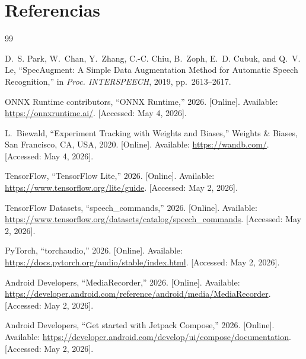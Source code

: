 \documentclass[conference]{IEEEtran}
\begin{document}
\section{Referencias}

\begin{thebibliography}{99}

D.~S. Park, W.~Chan, Y.~Zhang, C.-C. Chiu, B.~Zoph, E.~D. Cubuk, and Q.~V. Le, ``SpecAugment: A Simple Data Augmentation Method for Automatic Speech Recognition,'' in \emph{Proc. INTERSPEECH}, 2019, pp.~2613--2617.

ONNX Runtime contributors, ``ONNX Runtime,'' 2026. [Online]. Available: \url{https://onnxruntime.ai/}. [Accessed: May 4, 2026].

L.~Biewald, ``Experiment Tracking with Weights and Biases,'' Weights \& Biases, San Francisco, CA, USA, 2020. [Online]. Available: \url{https://wandb.com/}. [Accessed: May 4, 2026].

TensorFlow, ``TensorFlow Lite,'' 2026. [Online]. Available: \url{https://www.tensorflow.org/lite/guide}. [Accessed: May 2, 2026].

TensorFlow Datasets, ``speech\_commands,'' 2026. [Online]. Available: \url{https://www.tensorflow.org/datasets/catalog/speech_commands}. [Accessed: May 2, 2026].

PyTorch, ``torchaudio,'' 2026. [Online]. Available: \url{https://docs.pytorch.org/audio/stable/index.html}. [Accessed: May 2, 2026].

Android Developers, ``MediaRecorder,'' 2026. [Online]. Available: \url{https://developer.android.com/reference/android/media/MediaRecorder}. [Accessed: May 2, 2026].

Android Developers, ``Get started with Jetpack Compose,'' 2026. [Online]. Available: \url{https://developer.android.com/develop/ui/compose/documentation}. [Accessed: May 2, 2026].

\end{thebibliography}
\end{document}
